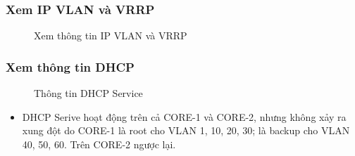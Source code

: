 \subsubsection{Xem IP VLAN và VRRP}
\begin{figure}[H]
			\hfill
			\hfill
			\caption{Xem thông tin IP VLAN và VRRP}
			\label{fig:Pic_1113}
\end{figure}
\subsubsection{Xem thông tin DHCP}
\begin{figure}[H]
			\hfill
			\hfill
			\caption{Thông tin DHCP Service}
			\label{fig:Pic_1114}
\end{figure}
\begin{itemize}
    \item DHCP Serive hoạt động trên cả CORE-1 và CORE-2, nhưng không xảy ra xung đột do CORE-1 là root cho VLAN 1, 10, 20, 30; là backup cho VLAN 40, 50, 60. Trên CORE-2 ngược lại.
\end{itemize}
